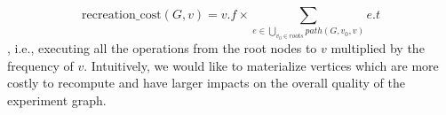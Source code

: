\[
\text{recreation\_cost}(G,v) = v.f \times \sum\limits_{e \in \bigcup\limits_{v_{0}\in roots} path(G, v_{0}, v)} e.t\]
, i.e., executing all the operations from the root nodes to $v$ multiplied by the frequency of $v$.
Intuitively, we would like to materialize vertices which are more costly to recompute and have larger impacts on the overall quality of the experiment graph.

%
%
